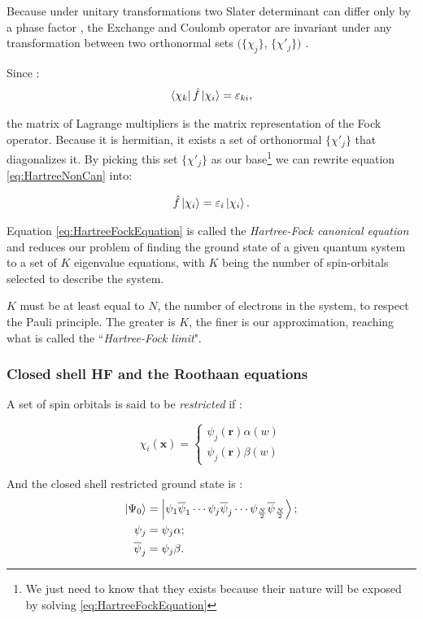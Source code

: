 \documentclass[a4paper,12pt]{article}
\begin{document}
Because under unitary transformations two Slater determinant can differ only by a phase factor \cite[p.120]{Attila}, the Exchange and Coulomb operator are invariant under any transformation between two orthonormal sets $(\{\chi_j\}$, $\{\chi'_j\})$ .

Since :
\begin{equation}
	\bra{\chi_k}\hat{f}\ket{\chi_i} = \varepsilon_{ki},
\end{equation}

the matrix of Lagrange multipliers is the matrix representation of the Fock operator.
Because it is hermitian, it exists a set of orthonormal $\{\chi'_j\}$ that diagonalizes it.
By picking this set $\{\chi'_j\}$ as our base\footnote{We just need to know that they exists because their nature will be exposed by solving \eqref{eq:HartreeFockEquation}} we can rewrite equation \eqref{eq:HartreeNonCan} into:

\begin{align}
	\hat{f} \ket{\chi_i} = \varepsilon_{i} \ket{\chi_{i}}. \label{eq:HartreeFockEquation}
\end{align}

Equation \eqref{eq:HartreeFockEquation} is called the \textit{Hartree-Fock canonical equation} and reduces our problem of finding the ground state of a given quantum system to a set of $K$ eigenvalue equations, with $K$ being the number of spin-orbitals selected to describe the system. 

$K$ must be at least equal to $N$, the number of electrons in the system, to respect the Pauli principle. The greater is $K$, the finer is our approximation, reaching what is called the ``\textit{Hartree-Fock limit}".

\subsubsection{Closed shell HF and the Roothaan equations} \label{sec:Roothan}

A set of spin orbitals is said to be \textit{restricted} if :


\[\chi_{i}(\mathbf{x}) = \left\{
  \begin{array}{lr}
    \psi_{j}(\mathbf{r}) \alpha(w)\\
    \psi_{j}(\mathbf{r}) \beta(w)
  \end{array}
\right.
\]

And the closed shell restricted ground state is :
\begin{align}
	\ket{\Psi_{0}} & = \ket{ \psi_{1} \overline{\psi}_{1} \cdots  
	\psi_{j} \overline{\psi}_{j}
	\cdots	
	\psi_{\frac{N}{2}} \overline{\psi}_{\frac{N}{2}}};
	\\
	\psi_{j} & = \psi_{j} \alpha;
	\\
	\overline{\psi}_{j} & = \psi_{j} \beta .
\end{align}
\end{document}
